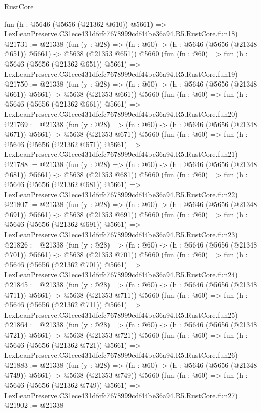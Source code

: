 \begin{lexlean}{RustCore}
\begin{coremodule}
    fun (h : @5646 (@5656 (@21362 @610)) @5661) =>
    LexLeanPreserve.C31ece431dfcfc7678999cdf44be36a94.R5.RustCore.fun18)
@21731 := @21338
    (fun (y : @28) => (fn : @60) -> (h : @5646 (@5656 (@21348 @651)) @5661) -> @5638 (@21353 @651))
    @5660
    (fun (fn : @60) =>
    fun (h : @5646 (@5656 (@21362 @651)) @5661) =>
    LexLeanPreserve.C31ece431dfcfc7678999cdf44be36a94.R5.RustCore.fun19)
@21750 := @21338
    (fun (y : @28) => (fn : @60) -> (h : @5646 (@5656 (@21348 @661)) @5661) -> @5638 (@21353 @661))
    @5660
    (fun (fn : @60) =>
    fun (h : @5646 (@5656 (@21362 @661)) @5661) =>
    LexLeanPreserve.C31ece431dfcfc7678999cdf44be36a94.R5.RustCore.fun20)
@21769 := @21338
    (fun (y : @28) => (fn : @60) -> (h : @5646 (@5656 (@21348 @671)) @5661) -> @5638 (@21353 @671))
    @5660
    (fun (fn : @60) =>
    fun (h : @5646 (@5656 (@21362 @671)) @5661) =>
    LexLeanPreserve.C31ece431dfcfc7678999cdf44be36a94.R5.RustCore.fun21)
@21788 := @21338
    (fun (y : @28) => (fn : @60) -> (h : @5646 (@5656 (@21348 @681)) @5661) -> @5638 (@21353 @681))
    @5660
    (fun (fn : @60) =>
    fun (h : @5646 (@5656 (@21362 @681)) @5661) =>
    LexLeanPreserve.C31ece431dfcfc7678999cdf44be36a94.R5.RustCore.fun22)
@21807 := @21338
    (fun (y : @28) => (fn : @60) -> (h : @5646 (@5656 (@21348 @691)) @5661) -> @5638 (@21353 @691))
    @5660
    (fun (fn : @60) =>
    fun (h : @5646 (@5656 (@21362 @691)) @5661) =>
    LexLeanPreserve.C31ece431dfcfc7678999cdf44be36a94.R5.RustCore.fun23)
@21826 := @21338
    (fun (y : @28) => (fn : @60) -> (h : @5646 (@5656 (@21348 @701)) @5661) -> @5638 (@21353 @701))
    @5660
    (fun (fn : @60) =>
    fun (h : @5646 (@5656 (@21362 @701)) @5661) =>
    LexLeanPreserve.C31ece431dfcfc7678999cdf44be36a94.R5.RustCore.fun24)
@21845 := @21338
    (fun (y : @28) => (fn : @60) -> (h : @5646 (@5656 (@21348 @711)) @5661) -> @5638 (@21353 @711))
    @5660
    (fun (fn : @60) =>
    fun (h : @5646 (@5656 (@21362 @711)) @5661) =>
    LexLeanPreserve.C31ece431dfcfc7678999cdf44be36a94.R5.RustCore.fun25)
@21864 := @21338
    (fun (y : @28) => (fn : @60) -> (h : @5646 (@5656 (@21348 @721)) @5661) -> @5638 (@21353 @721))
    @5660
    (fun (fn : @60) =>
    fun (h : @5646 (@5656 (@21362 @721)) @5661) =>
    LexLeanPreserve.C31ece431dfcfc7678999cdf44be36a94.R5.RustCore.fun26)
@21883 := @21338
    (fun (y : @28) => (fn : @60) -> (h : @5646 (@5656 (@21348 @749)) @5661) -> @5638 (@21353 @749))
    @5660
    (fun (fn : @60) =>
    fun (h : @5646 (@5656 (@21362 @749)) @5661) =>
    LexLeanPreserve.C31ece431dfcfc7678999cdf44be36a94.R5.RustCore.fun27)
@21902 := @21338

\end{coremodule}
\end{lexlean}
